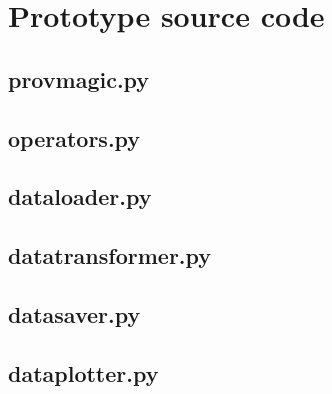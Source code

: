 \chapter{Prototype source code}
\label{ap:prototype}
\section{provmagic.py}

\section{operators.py}

\section{dataloader.py}

\section{datatransformer.py}

\section{datasaver.py}

\section{dataplotter.py}


% 


